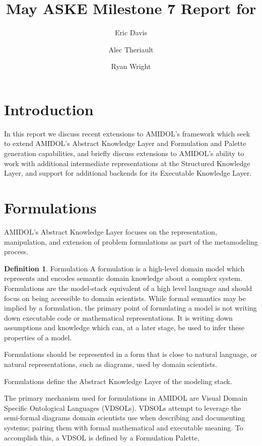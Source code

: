 \documentclass[11pt]{article}
\date{\vspace{-5ex}}
\author[1]{Eric Davis}
\author[1]{Alec Theriault}
\author[1]{Ryan Wright}
\affil[1]{Galois, Inc}
\title{May ASKE Milestone 7 Report for \amidol{}}
\theoremstyle{definition}
\newtheorem{definition}{Definition}[section]
\newcommand{\amidol}{\textsc{AMIDOL}}
\begin{document}
\maketitle
\vspace{10pt}

\section{Introduction}

In this report we discuss recent extensions to \amidol{}'s framework
which seek to extend \amidol{}'s Abstract Knowledge Layer and
Formulation and Palette generation capabilities, and briefly discuss
extensions to \amidol{}'s ability to work with additional intermediate
representations at the Structured Knowledge Layer, and support for
additional backends for its Executable Knowledge Layer.

\section{Formulations}

\amidol{}'s Abstract Knowledge Layer focuses on the representation,
manipulation, and extension of problem formulations as part of the
metamodeling process.

\begin{definition}{Formulation}
  A formulation is a high-level domain model which represents and
  encodes semantic domain knowledge about a complex system.
  Formulations are the model-stack equivalent of a high level
  language and should focus on being accessible to domain scientists.
  While formal semantics may be implied by a formulation, the primary
  point of formulating a model is not writing down executable code or
  mathematical representations.  It is
  writing down assumptions and knowledge which can, at a later stage,
  be used to infer these properties of a model.

  Formulations should be represented in a form that is close to
  natural language, or natural representations, such as diagrams, used
  by domain scientists.

  Formulations define the Abstract Knowledge Layer of the modeling stack.
\end{definition}

The primary mechanism used for formulations in \amidol{} are Visual
Domain Specific Ontological Languages (VDSOLs).  VDSOLs attempt to
leverage the semi-formal diagrams domain scientists use when
describing and documenting systems; pairing them with formal
mathematical and executable meaning.  To accomplish this, a VDSOL is defined by
a Formulation Palette,
\end{document}
